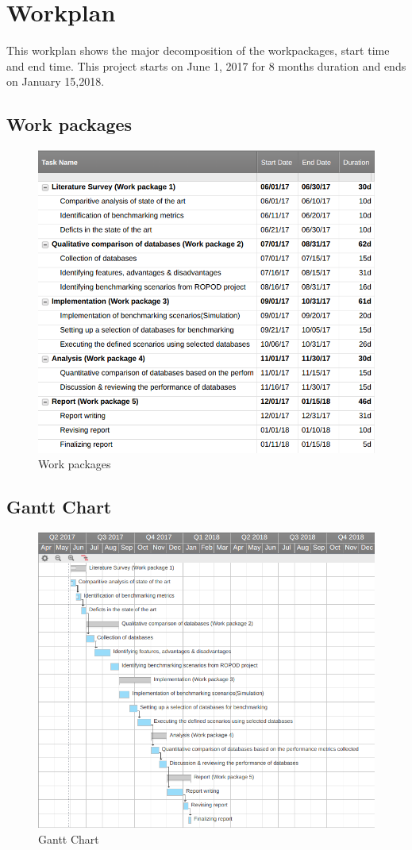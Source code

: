 \documentclass[12pt]{article}
\begin{document}
\section{Workplan}
This workplan shows the major decomposition of the workpackages, start time and end time. This project starts on June 1, 2017 for 8 months duration and ends on January 15,2018.
\subsection{Work packages}
\begin{figure}[h!]
  \includegraphics[width=\linewidth]{work_packages.png}
  \caption{Work packages}
  \label{fig:work_packages}
\end{figure}
\newpage
\subsection{Gantt Chart}
\begin{figure}[h!]
  \includegraphics[width=\linewidth]{gantt_chart.png}
  \caption{Gantt Chart}
  \label{fig:gantt_chart}
\end{figure}
\newpage
\end{document}
